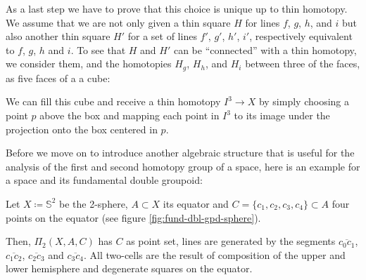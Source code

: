 \begin{defn}
As a last step we have to prove that this choice is unique up to thin homotopy.
We assume that we are not only given a thin square $H$ for
lines $f$, $g$, $h$, and $i$ but also another thin square $H'$ for a set of lines
$f'$, $g'$, $h'$, $i'$, respectively equivalent to $f$, $g$, $h$ and $i$.
To see that $H$ and $H'$ can be ``connected'' with a thin homotopy,
we consider them, and the homotopies $H_g$, $H_h$, and $H_i$ between three of the faces,
as five faces of a a cube:

\begin{center}
\end{center}

We can fill this cube and receive a thin homotopy $I^3 \to X$ by simply choosing
a point $p$ above the box and mapping each point in $I^3$ to its image under the
projection onto the box centered in $p$.
\end{defn}

Before we move on to introduce another algebraic structure that is useful for
the analysis of the first and second homotopy group of a space, here is an example
for a space and its fundamental double groupoid:

\begin{example} \label{example:fdblgpd-sphere}
Let $X \coloneqq \mathbb{S}^2$ be the 2-sphere, $A \subset X$ its equator and
$C = \{c_1, c_2, c_3, c_4\} \subset A$ four points on the equator (see
figure \ref{fig:fund-dbl-gpd-sphere}).

Then, $\Pi_2(X, A, C)$ has $C$ as point set, lines are generated by the segments
$\overline{c_0 c_1}$, $\overline{c_1 c_2}$, $\overline{c_2 c_3}$ and
$\overline{c_3 c_4}$.
All two-cells are the result of composition of the upper and lower hemisphere
and degenerate squares on the equator.
\end{example}

